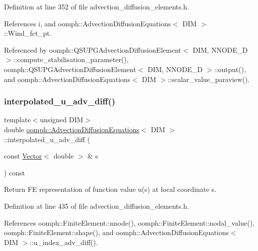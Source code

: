 Definition at line 352 of file advection\+\_\+diffusion\+\_\+elements.\+h.



References i, and oomph\+::\+Advection\+Diffusion\+Equations$<$ D\+I\+M $>$\+::\+Wind\+\_\+fct\+\_\+pt.



Referenced by oomph\+::\+Q\+S\+U\+P\+G\+Advection\+Diffusion\+Element$<$ D\+I\+M, N\+N\+O\+D\+E\+\_\+D $>$\+::compute\+\_\+stabilisation\+\_\+parameter(), oomph\+::\+Q\+S\+U\+P\+G\+Advection\+Diffusion\+Element$<$ D\+I\+M, N\+N\+O\+D\+E\+\_\+D $>$\+::output(), and oomph\+::\+Advection\+Diffusion\+Equations$<$ D\+I\+M $>$\+::scalar\+\_\+value\+\_\+paraview().

\mbox{\label{classoomph_1_1AdvectionDiffusionEquations_a2c5d80050fd9586bcf2d87951c346f58}} 
\subsubsection{\texorpdfstring{interpolated\+\_\+u\+\_\+adv\+\_\+diff()}{interpolated\_u\_adv\_diff()}}
{\footnotesize\ttfamily template$<$unsigned D\+IM$>$ \\
double \hyperlink{classoomph_1_1AdvectionDiffusionEquations}{oomph\+::\+Advection\+Diffusion\+Equations}$<$ D\+IM $>$\+::interpolated\+\_\+u\+\_\+adv\+\_\+diff (\begin{DoxyParamCaption}\item[{const \hyperlink{classoomph_1_1Vector}{Vector}$<$ double $>$ \&}]{s }\end{DoxyParamCaption}) const\hspace{0.3cm}{\ttfamily [inline]}}



Return FE representation of function value u(s) at local coordinate s. 



Definition at line 435 of file advection\+\_\+diffusion\+\_\+elements.\+h.



References oomph\+::\+Finite\+Element\+::nnode(), oomph\+::\+Finite\+Element\+::nodal\+\_\+value(), oomph\+::\+Finite\+Element\+::shape(), and oomph\+::\+Advection\+Diffusion\+Equations$<$ D\+I\+M $>$\+::u\+\_\+index\+\_\+adv\+\_\+diff().




